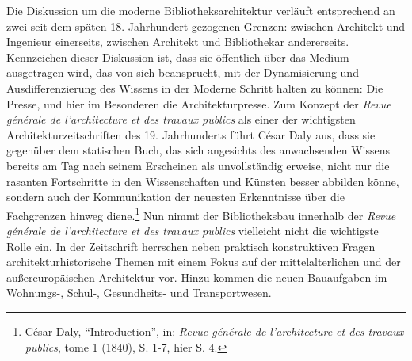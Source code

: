 Die Diskussion um die moderne Bibliotheksarchitektur verläuft
entsprechend an zwei seit dem späten 18. Jahrhundert gezogenen Grenzen:
zwischen Architekt und Ingenieur einerseits, zwischen Architekt und
Bibliothekar andererseits. Kennzeichen dieser Diskussion ist, dass sie
öffentlich über das Medium ausgetragen wird, das von sich beansprucht,
mit der Dynamisierung und Ausdifferenzierung des Wissens in der Moderne
Schritt halten zu können: Die Presse, und hier im Besonderen die
Architekturpresse. Zum Konzept der \emph{Revue générale de
l'architecture et des travaux publics} als einer der wichtigsten
Architekturzeitschriften des 19. Jahrhunderts führt César Daly aus, dass
sie gegenüber dem statischen Buch, das sich angesichts des anwachsenden
Wissens bereits am Tag nach seinem Erscheinen als unvollständig erweise,
nicht nur die rasanten Fortschritte in den Wissenschaften und Künsten
besser abbilden könne, sondern auch der Kommunikation der neuesten
Erkenntnisse über die Fachgrenzen hinweg diene.\footnote{César Daly,
  \enquote{Introduction}, in: \emph{Revue générale de l'architecture et
  des travaux publics}, tome 1 (1840), S. 1-7, hier S. 4.} Nun nimmt der
Bibliotheksbau innerhalb der \emph{Revue générale de l'architecture et
des travaux publics} vielleicht nicht die wichtigste Rolle ein. In der
Zeitschrift herrschen neben praktisch konstruktiven Fragen
architekturhistorische Themen mit einem Fokus auf der mittelalterlichen
und der außereuropäischen Architektur vor. Hinzu kommen die neuen
Bauaufgaben im Wohnungs-, Schul-, Gesundheits- und Transportwesen.

